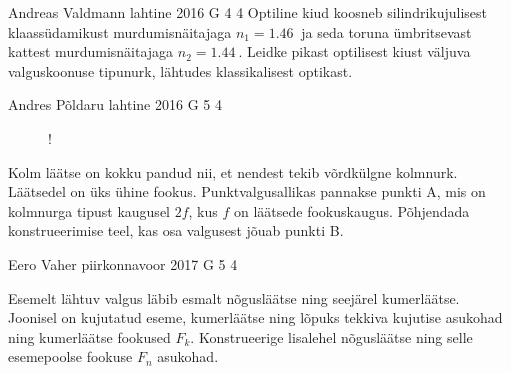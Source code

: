 \documentclass[11pt]{article}
\begin{document}
{%
{Andreas Valdmann} %
{lahtine} %
{2016} %
{G 4} %
{4} %
{
\ifStatement
Optiline kiud koosneb silindrikujulisest klaassüdamikust murdumisnäitajaga $n_1=\SI{1,46}{}$ ja seda toruna ümbritsevast kattest murdumisnäitajaga $n_2=\SI{1,44}{}$. Leidke pikast optilisest kiust väljuva valguskoonuse tipunurk, lähtudes klassikalisest optikast.
\fi
}

{Andres Põldaru} %
{lahtine} %
{2016} %
{G 5} %
{4} %
{
\ifStatement
\begin{figure}
	\vspace{-20pt}
	\begin{resizebox}{0.6\textwidth}{!}{
}
	\end{resizebox}
\end{figure}

Kolm läätse on kokku pandud nii, et nendest tekib võrdkülgne kolmnurk. Läätsedel on üks ühine fookus. Punktvalgusallikas pannakse punkti A, mis on kolmnurga tipust kaugusel $2f$, kus $f$ on läätsede fookuskaugus. Põhjendada konstrueerimise teel, kas osa valgusest jõuab punkti B.
\fi
}

{Eero Vaher} %
{piirkonnavoor} %
{2017} %
{G 5} %
{4} %
{
\ifStatement
Esemelt lähtuv valgus läbib esmalt nõgusläätse ning seejärel kumerläätse. Joonisel on kujutatud eseme, kumerläätse ning lõpuks tekkiva kujutise asukohad ning kumerläätse fookused $F_k$. Konstrueerige lisalehel nõgusläätse ning selle esemepoolse fookuse $F_n$ asukohad. 

}}
\end{document}

